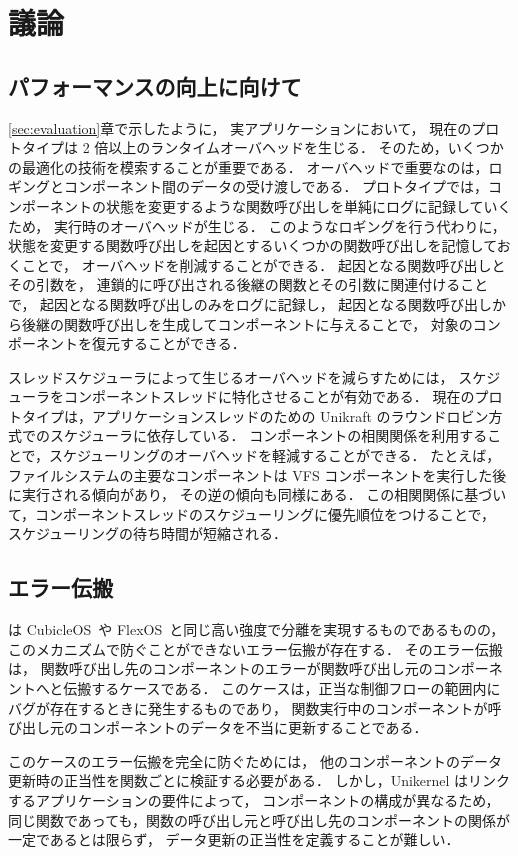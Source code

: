 \section{議論}
\label{sec:disc}

\subsection{パフォーマンスの向上に向けて}

\ref{sec:evaluation}章で示したように，
実アプリケーションにおいて，
現在のプロトタイプは 2 倍以上のランタイムオーバヘッドを生じる．
そのため，いくつかの最適化の技術を模索することが重要である．
オーバヘッドで重要なのは，ロギングとコンポーネント間のデータの受け渡しである．
プロトタイプでは，コンポーネントの状態を変更するような関数呼び出しを単純にログに記録していくため，
実行時のオーバヘッドが生じる．
このようなロギングを行う代わりに，状態を変更する関数呼び出しを起因とするいくつかの関数呼び出しを記憶しておくことで，
オーバヘッドを削減することができる．
起因となる関数呼び出しとその引数を，
連鎖的に呼び出される後継の関数とその引数に関連付けることで，
起因となる関数呼び出しのみをログに記録し，
起因となる関数呼び出しから後継の関数呼び出しを生成してコンポーネントに与えることで，
対象のコンポーネントを復元することができる．

スレッドスケジューラによって生じるオーバヘッドを減らすためには，
スケジューラをコンポーネントスレッドに特化させることが有効である．
現在のプロトタイプは，アプリケーションスレッドのための Unikraft のラウンドロビン方式でのスケジューラに依存している．
コンポーネントの相関関係を利用することで，スケジューリングのオーバヘッドを軽減することができる．
たとえば，ファイルシステムの主要なコンポーネントは VFS コンポーネントを実行した後に実行される傾向があり，
その逆の傾向も同様にある．
この相関関係に基づいて，コンポーネントスレッドのスケジューリングに優先順位をつけることで，
スケジューリングの待ち時間が短縮される．


\subsection{エラー伝搬}

\sysname は CubicleOS~\cite{SartakovEtAl-ASPLOS21}や FlexOS~\cite{LefeuvreEtAl-FlexOS}と同じ高い強度で分離を実現するものであるものの，
このメカニズムで防ぐことができないエラー伝搬が存在する．
そのエラー伝搬は，
関数呼び出し先のコンポーネントのエラーが関数呼び出し元のコンポーネントへと伝搬するケースである．
このケースは，正当な制御フローの範囲内にバグが存在するときに発生するものであり，
関数実行中のコンポーネントが呼び出し元のコンポーネントのデータを不当に更新することである．

このケースのエラー伝搬を完全に防ぐためには，
他のコンポーネントのデータ更新時の正当性を関数ごとに検証する必要がある．
しかし，Unikernel はリンクするアプリケーションの要件によって，
コンポーネントの構成が異なるため，
同じ関数であっても，関数の呼び出し元と呼び出し先のコンポーネントの関係が一定であるとは限らず，
データ更新の正当性を定義することが難しい．


